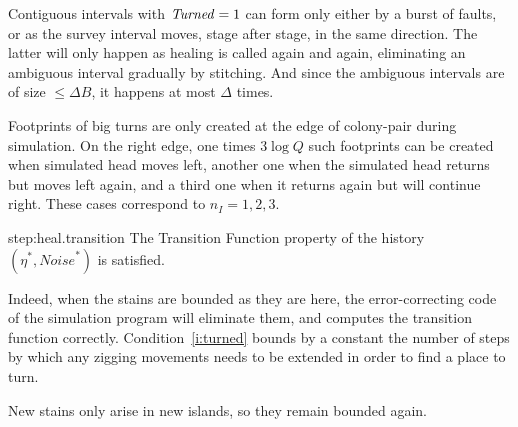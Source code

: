 \documentclass[11pt]{memoir}
\theoremstyle{definition} %
\renewcommand{\le}{\leq}
\newcommand{\fld}[1]{\ensuremath{\textit{#1\/}}}
\def\B{B}
\newcommand{\Noise}{\mathit{Noise}}
\newcommand{\Q}{Q} %
\newcommand{\Turned}{\fld{Turned}} %
\begin{document}
\begin{Proof}
\begin{pproof}
Contiguous intervals with \( \Turned=1 \) can form only either by a burst of faults, or
as the survey interval moves, stage after stage, in the same direction.
The latter will only happen as healing is called again and again, eliminating an ambiguous interval
gradually by stitching.
And since the ambiguous intervals are of size \( \le\Delta\B \), it happens at most \( \Delta \) times.

Footprints of big turns are only created at the edge of colony-pair during simulation.
On the right edge, one times \( 3\log\Q \) such footprints can be created when simulated
head moves left,
another one when the simulated head returns but moves left again,
and a third one when it returns again but will continue right.
These cases correspond to \( n_{I}=1,2,3 \).
\end{pproof}

\begin{step+}{step:heal.transition}
 The Transition Function property of the history \( (\eta^{*},\Noise^{*}) \) is satisfied.
\end{step+}
\begin{prooof}
Indeed, when the stains are bounded as they are here, the error-correcting code of the
simulation program will eliminate them, and computes the transition function correctly.
Condition~\eqref{i:turned} bounds by a constant the number of steps by which any zigging movements
needs to be extended in order to find a place to turn.

New stains only arise in new islands, so they remain bounded again.  
\end{prooof}
\end{Proof}
\end{document}
